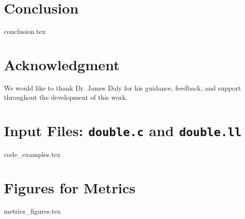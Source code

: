 \documentclass[conference]{IEEEtran}
\begin{document}
\section{Conclusion}
\label{sec:conclusion}
{conclusion.tex}

\section*{Acknowledgment}
We would like to thank Dr. James Daly for his guidance, feedback, and support throughout the development of this work.




\newpage \appendices \onecolumn


\section{Input Files: \texttt{double.c} and \texttt{double.ll}}
\label{app:code_examples}
{code_examples.tex}

\section{Figures for Metrics}
\label{app:metrics_figures}
{metrics_figures.tex}


\vspace{2ex}

\end{document}
